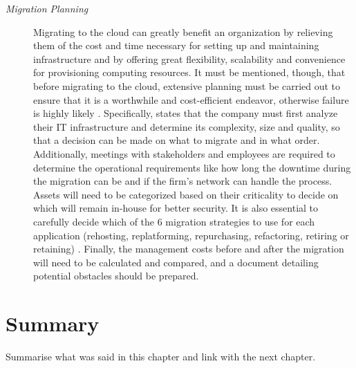 \begin{description}
    \item[\textit{Migration Planning}] Migrating to the cloud can greatly benefit an organization by relieving them of the cost and time necessary for setting up and maintaining infrastructure and by offering great flexibility, scalability and convenience for provisioning computing resources. It must be mentioned, though, that before migrating to the cloud, extensive planning must be carried out to ensure that it is a worthwhile and cost-efficient endeavor, otherwise failure is highly likely \cite{cloud-failure}.  Specifically, \cite{migration-planning} states that the company must first analyze their IT infrastructure and determine its complexity, size and quality, so that a decision can be made on what to migrate and in what order. Additionally, meetings with stakeholders and employees are required to determine the operational requirements like how long the downtime during the migration can be and if the firm's network can handle the process. Assets will need to be categorized based on their criticality to decide on which will remain in-house for better security. It is also essential to carefully decide which of the 6 migration strategies to use for each application (rehosting, replatforming, repurchasing, refactoring, retiring or retaining) \cite{6rs}. Finally, the management costs before and after the migration will need to be calculated and compared, and a document detailing potential obstacles should be prepared.

\end{description}


\section{Summary}
Summarise what was said in this chapter and link with the next chapter.
